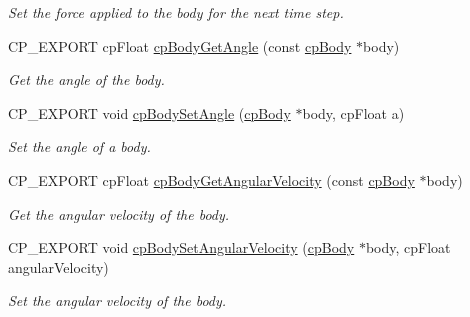 \begin{DoxyCompactItemize}
\begin{DoxyCompactList}\small\item\em Set the force applied to the body for the next time step. \end{DoxyCompactList}\item 
\mbox{\label{group__cpBody_gae61b861f4de0179abbec6bbe32b88c0c}} 
C\+P\+\_\+\+E\+X\+P\+O\+RT cp\+Float \hyperlink{group__cpBody_gae61b861f4de0179abbec6bbe32b88c0c}{cp\+Body\+Get\+Angle} (const \hyperlink{structcpBody}{cp\+Body} $\ast$body)
\begin{DoxyCompactList}\small\item\em Get the angle of the body. \end{DoxyCompactList}\item 
\mbox{\label{group__cpBody_gacdb6ef07e0efedbde6f7742fb805e0e2}} 
C\+P\+\_\+\+E\+X\+P\+O\+RT void \hyperlink{group__cpBody_gacdb6ef07e0efedbde6f7742fb805e0e2}{cp\+Body\+Set\+Angle} (\hyperlink{structcpBody}{cp\+Body} $\ast$body, cp\+Float a)
\begin{DoxyCompactList}\small\item\em Set the angle of a body. \end{DoxyCompactList}\item 
\mbox{\label{group__cpBody_ga68852fe11b09c4dd14385f7f5e4454bf}} 
C\+P\+\_\+\+E\+X\+P\+O\+RT cp\+Float \hyperlink{group__cpBody_ga68852fe11b09c4dd14385f7f5e4454bf}{cp\+Body\+Get\+Angular\+Velocity} (const \hyperlink{structcpBody}{cp\+Body} $\ast$body)
\begin{DoxyCompactList}\small\item\em Get the angular velocity of the body. \end{DoxyCompactList}\item 
\mbox{\label{group__cpBody_gacc650639383006ae40657883b9ecf02d}} 
C\+P\+\_\+\+E\+X\+P\+O\+RT void \hyperlink{group__cpBody_gacc650639383006ae40657883b9ecf02d}{cp\+Body\+Set\+Angular\+Velocity} (\hyperlink{structcpBody}{cp\+Body} $\ast$body, cp\+Float angular\+Velocity)
\begin{DoxyCompactList}\small\item\em Set the angular velocity of the body. \end{DoxyCompactList}\item 
\mbox{\label{group__cpBody_ga77bde17091dff1496e695fbba26037bb}} 

\end{DoxyCompactItemize}
